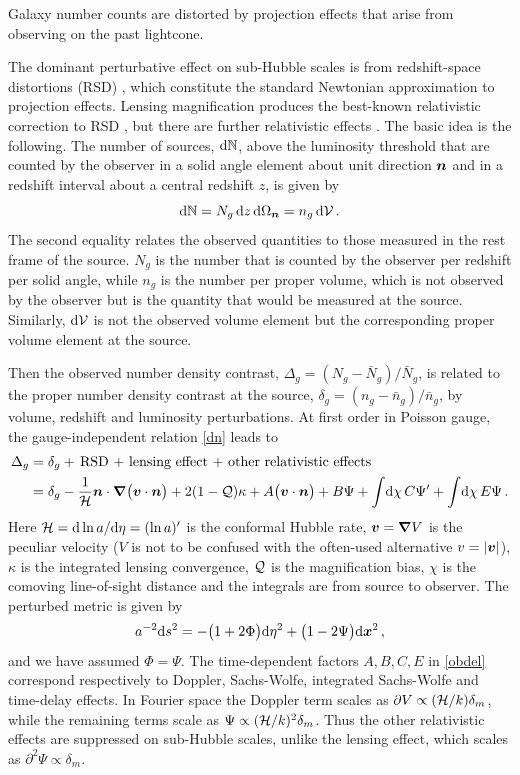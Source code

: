 Galaxy number counts are distorted by projection effects that arise from observing on the past lightcone. {The dominant perturbative effect on sub-Hubble  scales is from redshift-space distortions (RSD) \cite{Sargent:1977,Kaiser:1987qv}, 
which constitute the standard Newtonian approximation to projection effects. Lensing magnification produces the best-known relativistic correction to RSD \cite{Villumsen:1995ar}, but there are further relativistic effects \cite{Yoo:2009au,Yoo:2010ni,Challinor:2011bk,Bonvin:2011bg}.
The basic idea is the following. The number of sources, $\mathrm{d} \mathbb{N} $,  {above the luminosity threshold} that are counted by the observer in a solid angle element about unit direction $\bm {n}$ and in a redshift interval about a central redshift $z$, is given by 
\begin{equation} \label{dn}
\mathrm{d} \mathbb{N} =N_g\, \mathrm{d} z\,\mathrm{d}\Omega_{\bm {n}}=  n_g\, \mathrm{d} {\cal V} \,. 
\end{equation}
The second equality relates the observed quantities to those measured in the rest frame of the source.
$N_g$ is the number that is counted by the observer per redshift per solid angle, while 
$ n_g$ is the number per proper volume, which is not observed by the observer but is the quantity that would be measured at the source. Similarly,  $\mathrm{d} {\cal V}$ is not the observed volume element but the corresponding proper volume element at the source.  

Then the observed number density contrast, $\Delta_g=(N_g-\bar{N}_g)/\bar{N}_g$, is related to the proper number density contrast at the source, $\delta_g=(n_g-\bar{n}_g)/\bar{n}_g$, by volume, redshift and {luminosity} perturbations. 
At first order  in Poisson gauge,  the gauge-independent relation \eqref{dn} leads to
\begin{align}
 \Delta_g&=\delta_g +\,\mbox{RSD +  lensing effect + other relativistic effects} \notag\\
\label{obdel}
&= \delta_g - \frac{1}{{\cal H}}\bm {n} \cdot \bm\nabla \big(\bm{v}  \cdot \bm {n} \big) + 2(1-{\cal Q})\kappa +  A\big(\bm{v}  \cdot \bm {n} \big)+B \Psi + \int\! \mathrm{d} \chi\,C\Psi' +\int\! \mathrm{d} \chi\,E\Psi \,.
\end{align}
Here ${\cal H}=\mathrm{d}\ln a/\mathrm{d} \eta=(\ln a)'$ is the conformal Hubble rate, $\bm{v}=\bm{\nabla} V$ is the peculiar velocity ($V$ is not to be confused with the often-used alternative $v=|\bm{v}|$), $\kappa$ is the integrated lensing convergence,  ${\cal Q}$ is the magnification bias, $\chi$ is the comoving line-of-sight distance and the integrals are from source to observer. 
The perturbed metric is given by
\begin{equation} \label{pds}
a^{-2}\mathrm{d} s^2=-\big(1+2\Phi \big)\mathrm{d} \eta^2+ \big(1-2\Psi \big)\mathrm{d} \bm {x}^2\,,
\end{equation}
and we have assumed $\Phi=\Psi$. The time-dependent factors $A,B,C,E$ in \eqref{obdel} correspond respectively to Doppler, Sachs-Wolfe, integrated Sachs-Wolfe and time-delay effects. In Fourier space the Doppler term scales as $\partial V \propto ({\cal H}/k)\delta_m$, while the remaining terms scale as $\Psi \propto ({\cal H}/k)^2\delta_m$. Thus the other relativistic effects are suppressed on sub-Hubble scales, unlike the lensing effect, which scales as $\partial^2 \Psi \propto \delta_m$.

}
